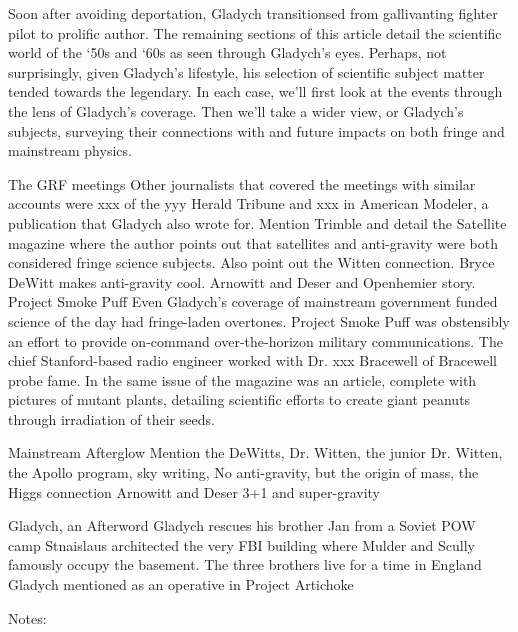 Soon after avoiding deportation, Gladych transitionsed from gallivanting fighter pilot to prolific author.  The remaining sections of this article detail the scientific world of the ‘50s and ‘60s as seen through Gladych’s eyes.  Perhaps, not surprisingly, given Gladych’s lifestyle, his selection of scientific subject matter tended towards the legendary.  In each case, we’ll first look at the events through the lens of Gladych’s coverage.  Then we’ll take a wider view, or Gladych’s subjects, surveying their connections with and future impacts on both fringe and mainstream physics.

The GRF meetings
Other journalists that covered the meetings with similar accounts were xxx of the yyy Herald Tribune and xxx in American Modeler, a publication that Gladych also wrote for.
Mention Trimble and detail the Satellite magazine where the author points out that satellites and anti-gravity were both considered fringe science subjects.  Also point out the Witten connection.  
Bryce DeWitt makes anti-gravity cool.  Arnowitt and Deser and Openhemier story.
Project Smoke Puff
Even Gladych’s coverage of mainstream government funded science of the day had fringe-laden overtones.  Project Smoke Puff was obstensibly an effort to provide on-command over-the-horizon military communications.  The chief Stanford-based radio engineer worked with Dr. xxx Bracewell of Bracewell probe fame.  
In the same issue of the magazine was an article, complete with pictures of mutant plants, detailing scientific efforts to create giant peanuts through irradiation of their seeds.

Mainstream Afterglow
Mention the DeWitts, Dr. Witten, the junior Dr. Witten, the Apollo program, sky writing, 
No anti-gravity, but the origin of mass, the Higgs connection
Arnowitt and Deser 3+1 and super-gravity


Gladych, an Afterword
Gladych rescues his brother Jan from a Soviet POW camp
Stnaislaus architected the very FBI building where Mulder and Scully famously occupy the basement.
The three brothers live for a time in England
Gladych mentioned as an operative in Project Artichoke

Notes:  
